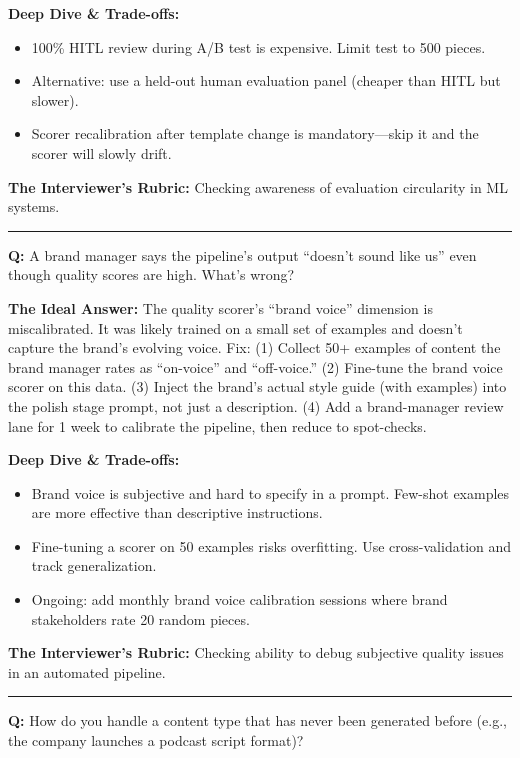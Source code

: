 \textbf{Deep Dive \& Trade-offs:}
\begin{itemize}
  \item 100\% HITL review during A/B test is expensive. Limit test to 500 pieces.
  \item Alternative: use a held-out human evaluation panel (cheaper than HITL but slower).
  \item Scorer recalibration after template change is mandatory---skip it and the scorer will slowly drift.
\end{itemize}

\textbf{The Interviewer's Rubric:} Checking awareness of evaluation circularity in ML systems.

\bigskip\hrule\bigskip

\textbf{Q:} A brand manager says the pipeline's output ``doesn't sound like us'' even though quality scores are high. What's wrong?

\textbf{The Ideal Answer:} The quality scorer's ``brand voice'' dimension is miscalibrated. It was likely trained on a small set of examples and doesn't capture the brand's evolving voice. Fix: (1) Collect 50+ examples of content the brand manager rates as ``on-voice'' and ``off-voice.'' (2) Fine-tune the brand voice scorer on this data. (3) Inject the brand's actual style guide (with examples) into the polish stage prompt, not just a description. (4) Add a brand-manager review lane for 1 week to calibrate the pipeline, then reduce to spot-checks.

\textbf{Deep Dive \& Trade-offs:}
\begin{itemize}
  \item Brand voice is subjective and hard to specify in a prompt. Few-shot examples are more effective than descriptive instructions.
  \item Fine-tuning a scorer on 50 examples risks overfitting. Use cross-validation and track generalization.
  \item Ongoing: add monthly brand voice calibration sessions where brand stakeholders rate 20 random pieces.
\end{itemize}

\textbf{The Interviewer's Rubric:} Checking ability to debug subjective quality issues in an automated pipeline.

\bigskip\hrule\bigskip

\textbf{Q:} How do you handle a content type that has never been generated before (e.g., the company launches a podcast script format)?

